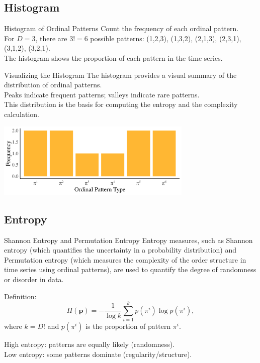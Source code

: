 \documentclass{beamer}
\begin{document}
\subsection{Histogram}

\begin{frame}{Histogram of Ordinal Patterns}
	Count the frequency of each ordinal pattern.\\
	For $D=3$, there are $3!=6$ possible patterns: (1,2,3), (1,3,2), (2,1,3), (2,3,1), (3,1,2), (3,2,1).\\
	The histogram shows the proportion of each pattern in the time series.
\end{frame}

\begin{frame}{Visualizing the Histogram}
	The histogram provides a visual summary of the distribution of ordinal patterns.\\
	Peaks indicate frequent 
	patterns; valleys indicate rare patterns.\\
	This distribution is the basis for computing the entropy and the complexity 
	calculation.
		\begin{center}
		\includegraphics[width=0.7\textwidth]{frequency histogram}
	\end{center}
\end{frame}

\subsection{Entropy}

\begin{frame}{Shannon Entropy and Permutation Entropy}
	Entropy measures, such as \alert{Shannon entropy} (which quantifies the uncertainty in a probability distribution) and \alert{Permutation entropy} (which measures the complexity of the order structure in time series using ordinal patterns), are used to quantify the degree of randomness or disorder in data. 
	\begin{block}{Definition:}
		\[
		H(\mathbf{p}) = -\dfrac{1}{\log k} \sum_{i=1}^{k} p(\pi^i) \log p(\pi^i),
		\]
		where $k=D!$ and $p(\pi^i)$ is the proportion of pattern $\pi^i$.
	\end{block}
	High entropy: patterns are equally likely (randomness).\\
	Low entropy: some patterns dominate (regularity/structure).
\end{frame}
\end{document}
